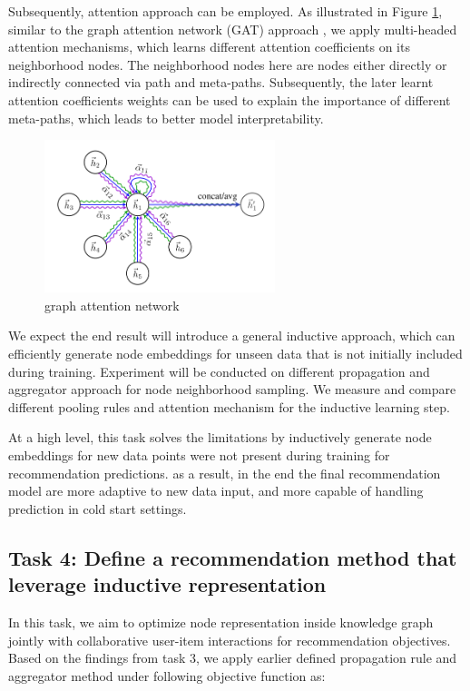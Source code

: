 Subsequently, attention approach can be employed. As illustrated in Figure \ref{fig:gat}, similar to the graph attention network (GAT) approach \citep{velivckovic2017graph}, we apply multi-headed attention mechanisms, which learns different attention coefficients on its neighborhood nodes. The neighborhood nodes here are nodes either directly or indirectly connected via path and meta-paths. Subsequently, the later learnt attention coefficients weights can be used to explain the importance of different meta-paths, which leads to better model interpretability.

\begin{figure}[!ht]
    \centering
    \includegraphics[width=0.6\textwidth]{figs/gat.png}
    \caption{graph attention network}\label{fig:gat}
\end{figure}

We expect the end result will introduce a general inductive approach, which can efficiently generate node embeddings for unseen data that is not initially included during training.
Experiment will be conducted on different propagation and aggregator approach for node neighborhood sampling. We measure and compare different pooling rules and attention mechanism for the inductive learning step.

At a high level, this task solves the limitations by inductively generate node embeddings for new data points were not present during training for recommendation predictions. as a result, in the end the final recommendation model are more adaptive to new data input, and more capable of handling prediction in cold start settings.


\subsection*{Task 4: Define a recommendation method that leverage inductive representation}
In this task, we aim to optimize node representation inside knowledge graph jointly with collaborative user-item interactions for recommendation objectives.
Based on the findings from task 3, we apply earlier defined propagation rule and aggregator method under following objective function as:

